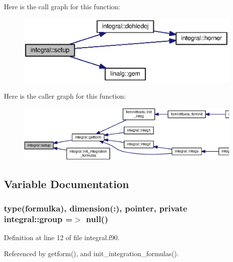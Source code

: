 Here is the call graph for this function\+:\nopagebreak
\begin{figure}[H]
\begin{center}
\leavevmode
\includegraphics[width=350pt]{namespaceintegral_a24274aecb38e46145fb771f116b452ba_cgraph}
\end{center}
\end{figure}




Here is the caller graph for this function\+:\nopagebreak
\begin{figure}[H]
\begin{center}
\leavevmode
\includegraphics[width=350pt]{namespaceintegral_a24274aecb38e46145fb771f116b452ba_icgraph}
\end{center}
\end{figure}




\subsection{Variable Documentation}
\subsubsection[{group}]{\setlength{\rightskip}{0pt plus 5cm}type({\bf formulka}), dimension(\+:), pointer, private integral\+::group =$>$ null()\hspace{0.3cm}{\ttfamily [private]}}\label{namespaceintegral_a9c872ca13e366bf47647fadfff816216}


Definition at line 12 of file integral.\+f90.



Referenced by getform(), and init\+\_\+integration\+\_\+formulas().


